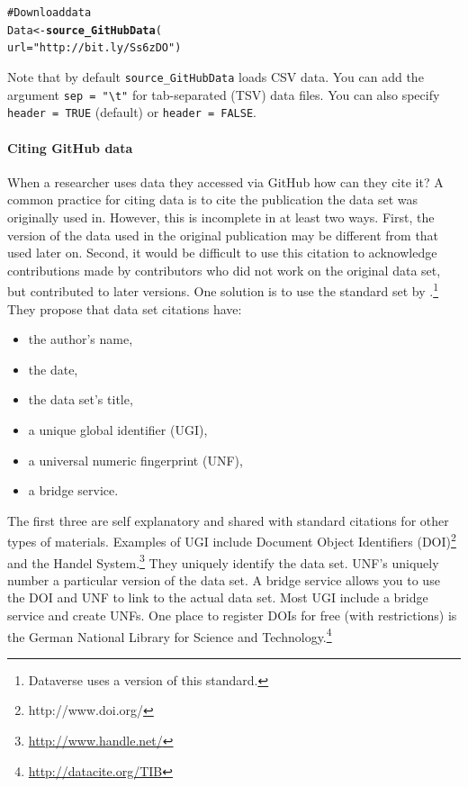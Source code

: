 \documentclass[twocolumn]{article}\usepackage{graphicx, color}
\makeatletter
\newcommand{\hlfunctioncall}[1]{\textcolor[rgb]{0.501960784313725,0,0.329411764705882}{\textbf{#1}}}%
\newcommand{\hlstring}[1]{\textcolor[rgb]{0.6,0.6,1}{#1}}%
\newcommand{\hlcomment}[1]{\textcolor[rgb]{0.180392156862745,0.6,0.341176470588235}{#1}}%
\newenvironment{kframe}{%
 \def\at@end@of@kframe{}%
 \ifinner\ifhmode%
  \def\at@end@of@kframe{\end{minipage}}%
  \begin{minipage}{\columnwidth}%
 \fi\fi%
 \def\FrameCommand##1{\hskip\@totalleftmargin \hskip-\fboxsep
 \colorbox{shadecolor}{##1}\hskip-\fboxsep
     \hskip-\linewidth \hskip-\@totalleftmargin \hskip\columnwidth}%
 \MakeFramed {\advance\hsize-\width
   \@totalleftmargin\z@ \linewidth\hsize
   \@setminipage}}%
 {\par\unskip\endMakeFramed%
 \at@end@of@kframe}
\newenvironment{knitrout}{}{} %
\makeatother
\begin{document}
\begin{knitrout}
\color{fgcolor}\begin{kframe}
\begin{alltt}
\hlcomment{# Download data}
Data <- \hlfunctioncall{source_GitHubData}(
          url = \hlstring{"http://bit.ly/Ss6zDO"})
\end{alltt}
\end{kframe}
\end{knitrout}


\noindent Note that by default \verb|source_GitHubData| loads CSV data. You can add the argument \verb|sep = "\t"| for tab-separated (TSV) data files. You can also specify \texttt{header = TRUE} (default) or \texttt{header = FALSE}.

\paragraph{Citing GitHub data}

When a researcher uses data they accessed via GitHub how can they cite it? A common practice for citing data is to cite the publication the data set was originally used in. However, this is incomplete in at least two ways. First, the version of the data used in the original publication may be different from that used later on. Second, it would be difficult to use this citation to acknowledge contributions made by contributors who did not work on the original data set, but contributed to later versions. One solution is to use the standard set by \cite{Altman2007} \citep[see also][183-184]{King2007}.\footnote{Dataverse uses a version of this standard.} They propose that data set citations have:

\begin{itemize}
  \item the author's name, 
  \item the date,
  \item the data set's title,
  \item a unique global identifier (UGI),
  \item a universal numeric fingerprint (UNF),
  \item a bridge service.
\end{itemize}

\noindent The first three are self explanatory and shared with standard citations for other types of materials. Examples of UGI include Document Object Identifiers (DOI)\footnote{http://www.doi.org/} and the Handel System.\footnote{\url{http://www.handle.net/}} They uniquely identify the data set. UNF's uniquely number a particular version of the data set. A bridge service allows you to use the DOI and UNF to link to the actual data set. Most UGI include a bridge service and create UNFs. One place to register DOIs for free (with restrictions) is the German National Library for Science and Technology.\footnote{\url{http://datacite.org/TIB}} 
\end{document}
